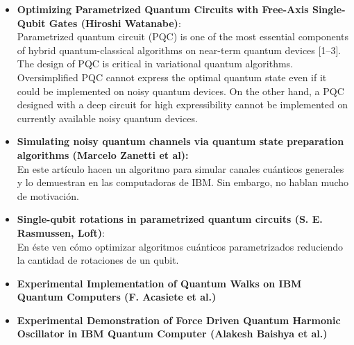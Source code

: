 \documentclass[10pt,letterpaper]{article} %
\begin{document}
\begin{itemize}
\item  \textbf{Optimizing Parametrized Quantum Circuits
with Free-Axis Single-Qubit Gates (Hiroshi Watanabe)}:\\

Parametrized quantum circuit (PQC) is one of the most essential components of hybrid quantum-classical
algorithms on near-term quantum devices [1–3]. \\

The design of PQC is critical in variational quantum algorithms. Oversimplified PQC cannot express
the optimal quantum state even if it could be implemented on noisy quantum devices. On the other
hand, a PQC designed with a deep circuit for high expressibility cannot be implemented on currently available noisy quantum devices.\\

\item \textbf{Simulating noisy quantum channels via quantum state preparation algorithms (Marcelo Zanetti et al):} \\

En este artículo hacen un algoritmo para simular canales cuánticos generales y lo demuestran en las computadoras de IBM. Sin embargo, no hablan mucho de motivación. 

\item \textbf{Single-qubit rotations in parametrized quantum circuits (S. E. Rasmussen, Loft)}:\\

En éste ven cómo optimizar algoritmos cuánticos parametrizados reduciendo la cantidad de rotaciones de un qubit.

\item \textbf{Experimental Implementation of Quantum Walks on
IBM Quantum Computers (F. Acasiete et al.)}

\item \textbf{Experimental Demonstration of Force Driven Quantum Harmonic Oscillator in IBM
Quantum Computer (Alakesh Baishya et al.)} \\


\end{itemize}
\end{document}
